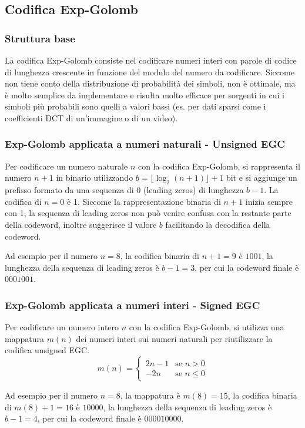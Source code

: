 \subsection{Codifica Exp-Golomb}
\subsubsection*{Struttura base}
La codifica Exp-Golomb consiste nel codificare numeri interi con parole di codice di lunghezza crescente in funzione
del modulo del numero da codificare. Siccome non tiene conto della distribuzione di probabilità dei simboli, non è ottimale,
ma è molto semplice da implementare e risulta molto efficace per sorgenti in cui i simboli più probabili sono quelli
a valori bassi (es. per dati sparsi come i coefficienti DCT di un'immagine o di un video).

\subsubsection*{Exp-Golomb applicata a numeri naturali - Unsigned EGC}
Per codificare un numero naturale \(n\) con la codifica Exp-Golomb, si rappresenta il numero \(n+1\) in binario utilizzando
\(b = \lfloor \log_2(n+1) \rfloor + 1\) bit e si aggiunge un prefisso formato da una sequenza di 0 (leading zeros) di
lunghezza \(b-1\). La codifica di \(n = 0\) è 1. Siccome la rappresentazione binaria di \(n+1\) inizia sempre con
1, la sequenza di leading zeros non può venire confusa con la restante parte della codeword, inoltre suggerisce il
valore \(b\) facilitando la decodifica della codeword.

Ad esempio per il numero \(n = 8\), la codifica binaria di \(n+1=9\) è \(1001\), la lunghezza della sequenza di leading
zeros è \(b-1 = 3\), per cui la codeword finale è \(0001001\).

\subsubsection*{Exp-Golomb applicata a numeri interi - Signed EGC}
Per codificare un numero intero \(n\) con la codifica Exp-Golomb, si utilizza una mappatura \(m(n)\) dei numeri interi sui
numeri naturali per riutilizzare la codifica unsigned EGC.
\[m(n) = \begin{cases}
	2n -1 & \text{se } n > 0 \\
	-2n & \text{se } n \leq 0
\end{cases}\]

Ad esempio per il numero \(n = 8\), la mappatura è \(m(8) = 15\), la codifica binaria di \(m(8)+1=16\) è \(10000\), la
lunghezza della sequenza di leading zeros è \(b-1 = 4\), per cui la codeword finale è \(000010000\).

